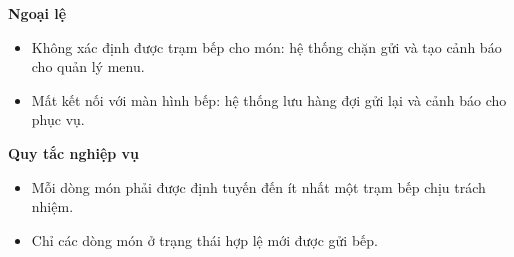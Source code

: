 \documentclass[11pt,a4paper]{article}
\begin{document}
\begin{usecasebox}[title={UC-ORD-03 --- Gửi đơn gọi món sang bếp}]
    \textbf{Ngoại lệ}
    \begin{itemize}[leftmargin=1.8em]
  \item Không xác định được trạm bếp cho món: hệ thống chặn gửi và tạo cảnh báo cho quản lý menu.
  \item Mất kết nối với màn hình bếp: hệ thống lưu hàng đợi gửi lại và cảnh báo cho phục vụ.
\end{itemize}

    \textbf{Quy tắc nghiệp vụ}
    \begin{itemize}[leftmargin=1.8em]
  \item Mỗi dòng món phải được định tuyến đến ít nhất một trạm bếp chịu trách nhiệm.
  \item Chỉ các dòng món ở trạng thái hợp lệ mới được gửi bếp.
\end{itemize}
    \end{usecasebox}
\end{document}
